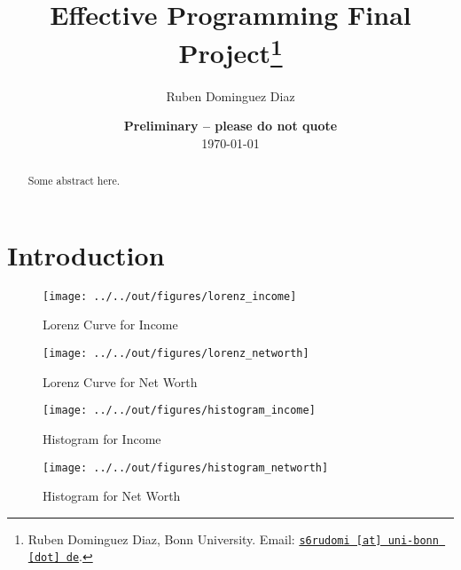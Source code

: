 \documentclass[11pt, a4paper, leqno]{article}
\begin{document}
\title{Effective Programming Final Project\thanks{Ruben Dominguez Diaz, Bonn University. Email: \href{mailto:s6rudomi@uni-bonn.de}{\nolinkurl{s6rudomi [at] uni-bonn [dot] de}}.}}

\author{Ruben Dominguez Diaz}

\date{
{\bf Preliminary -- please do not quote} 
\\[1ex] 
\today
}

\maketitle


\begin{abstract}
	Some abstract here.
\end{abstract}
\clearpage

\section{Introduction} %
\label{sec:introduction}


\begin{figure}
    \caption{Lorenz Curve for Income}
    
    \texttt{[image: ../../out/figures/lorenz\_income]}

\end{figure}


\begin{figure}
    \caption{Lorenz Curve for Net Worth}
    
    \texttt{[image: ../../out/figures/lorenz\_networth]}

\end{figure}

\begin{figure}
    \caption{Histogram for Income}
    
    \texttt{[image: ../../out/figures/histogram\_income]}

\end{figure}

\begin{figure}
    \caption{Histogram for Net Worth}
    
    \texttt{[image: ../../out/figures/histogram\_networth]}

\end{figure}






% 




\end{document}
